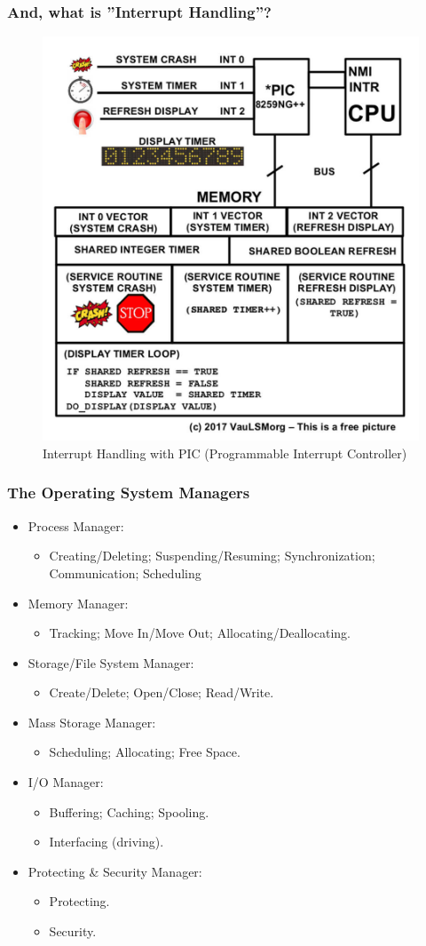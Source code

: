 \documentclass[aspectratio=169, xcolor=table, notheorems, hyperref={pdfpagelabels=false}]{beamer}
\begin{document}
\begin{frame}
\frametitle{And, what is ''Interrupt Handling''?}
\begin{figure}
\includegraphics[width=0.40\linewidth]{os00-int-protection}
\caption{Interrupt Handling with PIC (Programmable Interrupt Controller)}
\end{figure}
\end{frame}

\begin{frame}
\frametitle{The Operating System Managers}
\begin{itemize}
\item Process Manager: 
\begin{itemize}
\item Creating/Deleting; Suspending/Resuming; Synchronization; Communication; Scheduling
\end{itemize}
\item Memory Manager:
\begin{itemize}
\item Tracking; Move In/Move Out; Allocating/Deallocating.
\end{itemize}
\item Storage/File System Manager:
\begin{itemize}
\item Create/Delete; Open/Close; Read/Write.
\end{itemize}
\item Mass Storage Manager:
\begin{itemize}
\item Scheduling; Allocating; Free Space.
\end{itemize}
\item I/O Manager:
\begin{itemize}
\item Buffering; Caching; Spooling.
\item Interfacing (driving).
\end{itemize}
\item Protecting \& Security Manager:
\begin{itemize}
\item Protecting.
\item Security.
\end{itemize}
\end{itemize}
\end{frame}
\end{document}
